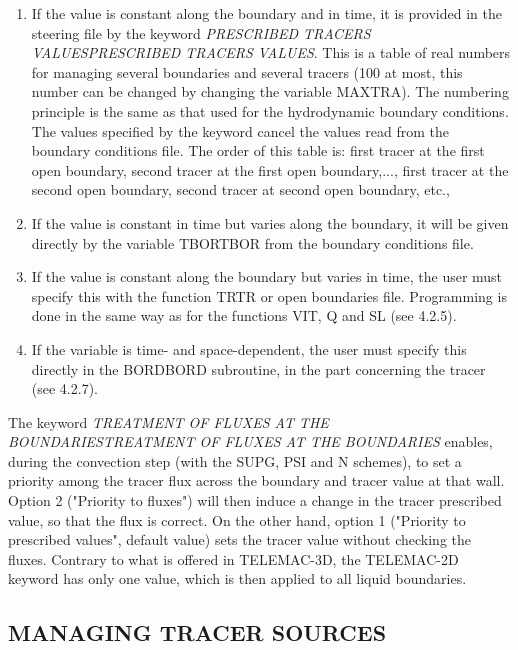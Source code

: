 \documentclass{article} %
\begin{document}
\begin{enumerate}
\item  If the value is constant along the boundary and in time, it is provided in the steering file by the keyword \textit{PRESCRIBED TRACERS VALUESPRESCRIBED TRACERS VALUES}. This is a table of real numbers for managing several boundaries and several tracers (100 at most, this number can be changed by changing the variable MAXTRA). The numbering principle is the same as that used for the hydrodynamic boundary conditions. The values specified by the keyword cancel the values read from the boundary conditions file. The order of this table is: first tracer at the first open boundary, second tracer at the first open boundary,..., first tracer at the second open boundary, second tracer at second open boundary, etc.,

\item  If the value is constant in time but varies along the boundary, it will be given directly by the variable TBORTBOR from the boundary conditions file.

\item  If the value is constant along the boundary but varies in time, the user must specify this with the function TRTR or open boundaries file. Programming is done in the same way as for the functions VIT, Q and SL (see 4.2.5).

\item  If the variable is time- and space-dependent, the user must specify this directly in the BORDBORD subroutine, in the part concerning the tracer (see 4.2.7).
\end{enumerate}

 The keyword \textit{TREATMENT OF FLUXES AT THE BOUNDARIESTREATMENT OF FLUXES AT THE BOUNDARIES} enables, during the convection step (with the SUPG, PSI and N schemes), to set a priority among the tracer flux across the boundary and tracer value at that wall. Option 2 ("Priority to fluxes") will then induce a change in the tracer prescribed value, so that the flux is correct. On the other hand, option 1 ("Priority to prescribed values", default value) sets the tracer value without checking the fluxes. Contrary to what is offered in TELEMAC-3D, the TELEMAC-2D keyword has only one value, which is then applied to all liquid boundaries.


\subsection{  MANAGING TRACER SOURCES}
\end{document}
